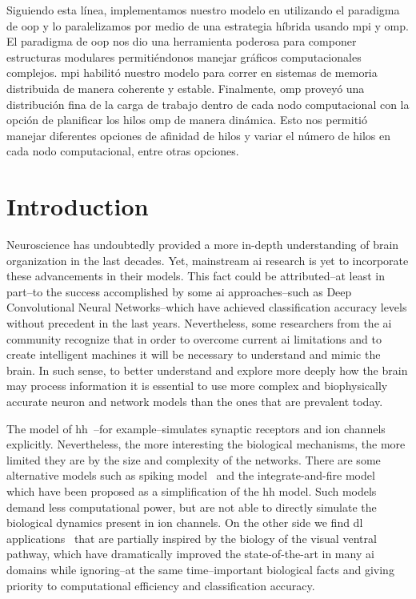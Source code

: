 {Siguiendo esta línea, implementamos nuestro modelo en  utilizando el paradigma de \gls{oop} y lo paralelizamos por medio de una estrategia híbrida usando \gls{mpi} y \gls{omp}.
El paradigma de \gls{oop} nos dio una herramienta poderosa para componer estructuras modulares permitiéndonos manejar gráficos computacionales complejos. \gls{mpi} habilitó nuestro modelo para correr en sistemas de memoria distribuida de manera coherente y estable.
Finalmente, \gls{omp} proveyó una distribución fina de la carga de trabajo dentro de cada nodo computacional con la opción de planificar los hilos \gls{omp} de manera dinámica.
Esto nos permitió manejar diferentes opciones de afinidad de hilos y variar el número de hilos en cada nodo computacional, entre otras opciones.
}{
\section{Introduction}

Neuroscience has undoubtedly provided a more in-depth understanding of brain organization in the last decades. Yet, mainstream \gls{ai} research is yet to incorporate these advancements in their models. This fact could be attributed--at least in part--to the success accomplished by some \gls{ai} approaches--such as Deep Convolutional Neural Networks--which have achieved classification accuracy levels without precedent in the last years. Nevertheless, some researchers from the \gls{ai} community recognize that in order to overcome current \gls{ai} limitations and to create intelligent machines it will be necessary to understand and mimic the brain. In such sense, to better understand and explore more deeply how the brain may process information it is essential to use more complex and biophysically accurate neuron and network models than the ones that are prevalent today.

The model of \gls{hh}~\cite{HODGKIN199025}--for example--simulates synaptic receptors and ion channels explicitly. Nevertheless, the more interesting the biological mechanisms, the more limited they are by the size and complexity of the networks. There are some alternative models such as spiking model~\cite{Izhikevich2004SpiketimingDO} and the integrate-and-fire model~\cite{1333071} which have been proposed as a simplification of the \gls{hh} model. Such models demand less computational power, but are not able to directly simulate the biological dynamics present in ion channels. On the other side we find \gls{dl} applications~\cite{lecun_deep_2015} that are partially inspired by the biology of the visual ventral pathway, which have dramatically improved the state-of-the-art in many \gls{ai} domains while ignoring--at the same time--important biological facts and giving priority to computational efficiency and classification accuracy. 

}
